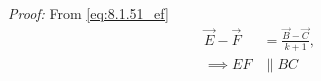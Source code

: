 \item {\em Proof: }
From \eqref{eq:8.1.51_ef}
\begin{align}
\vec{E} - \vec{F} &= \frac{\vec{B}-\vec{C}}{k+1}, 
\\
\implies EF &\parallel BC
\end{align}

